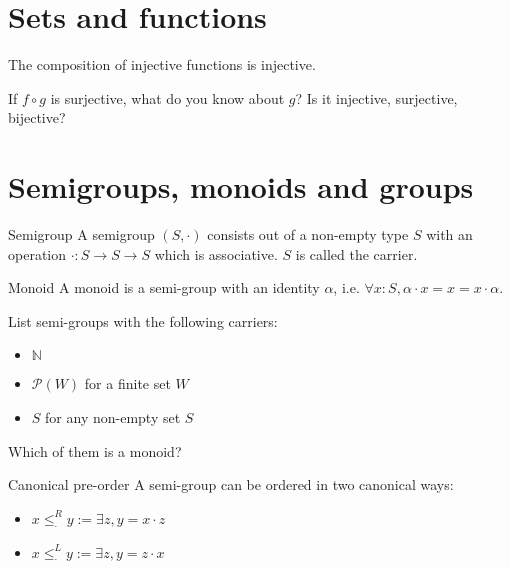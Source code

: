 \def\pathToRoot{../../}




\section{Sets and functions}

\begin{exercise}
  The composition of injective functions is injective.
\end{exercise}

\begin{exercise}
  If $f \circ g$ is surjective, what do you know about $g$? Is it injective, surjective, bijective?
\end{exercise}

\section{Semigroups, monoids and groups}

\begin{definition}{Semigroup}
  A semigroup $(S, \cdot)$ consists out of a non-empty type $S$ with an operation $\cdot : S \to S \to S$ which is associative.
  $S$ is called the carrier.
\end{definition}

\begin{definition}{Monoid}
  A monoid is a semi-group with an identity $\alpha$, i.e. $\forall x : S, \alpha \cdot x = x = x \cdot \alpha$.
\end{definition}

\begin{exercise}
  List semi-groups with the following carriers:
  \begin{multicols}{3}
    \begin{itemize}
    \item $\mathbb{N}$
    \item $\mathcal{P}(W)$ for a finite set $W$
    \item $S$ for any non-empty set $S$
    \end{itemize}
  \end{multicols}

  Which of them is a monoid?
\end{exercise}

\begin{definition}{Canonical pre-order}
  A semi-group can be ordered in two canonical ways:
  \begin{itemize}
  \item $x \leq^R_\cdot y := \exists z, y = x \cdot z$
  \item $x \leq^L_\cdot y := \exists z, y = z \cdot x$
  \end{itemize}
\end{definition}

